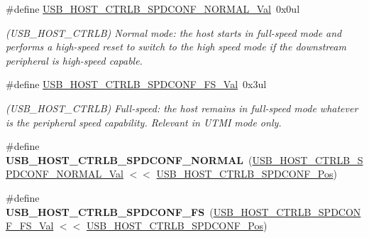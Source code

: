 \begin{DoxyCompactItemize}
\item 
\hypertarget{group___s_a_m_l21___u_s_b_ga42c2b2ba1944825832bb3ebe046512ba}{}\#define \hyperlink{group___s_a_m_l21___u_s_b_ga42c2b2ba1944825832bb3ebe046512ba}{U\+S\+B\+\_\+\+H\+O\+S\+T\+\_\+\+C\+T\+R\+L\+B\+\_\+\+S\+P\+D\+C\+O\+N\+F\+\_\+\+N\+O\+R\+M\+A\+L\+\_\+\+Val}~0x0ul\label{group___s_a_m_l21___u_s_b_ga42c2b2ba1944825832bb3ebe046512ba}

\begin{DoxyCompactList}\small\item\em (U\+S\+B\+\_\+\+H\+O\+S\+T\+\_\+\+C\+T\+R\+L\+B) Normal mode\+: the host starts in full-\/speed mode and performs a high-\/speed reset to switch to the high speed mode if the downstream peripheral is high-\/speed capable. \end{DoxyCompactList}\item 
\hypertarget{group___s_a_m_l21___u_s_b_ga8767ff75fe74316d97f511855ef2aca1}{}\#define \hyperlink{group___s_a_m_l21___u_s_b_ga8767ff75fe74316d97f511855ef2aca1}{U\+S\+B\+\_\+\+H\+O\+S\+T\+\_\+\+C\+T\+R\+L\+B\+\_\+\+S\+P\+D\+C\+O\+N\+F\+\_\+\+F\+S\+\_\+\+Val}~0x3ul\label{group___s_a_m_l21___u_s_b_ga8767ff75fe74316d97f511855ef2aca1}

\begin{DoxyCompactList}\small\item\em (U\+S\+B\+\_\+\+H\+O\+S\+T\+\_\+\+C\+T\+R\+L\+B) Full-\/speed\+: the host remains in full-\/speed mode whatever is the peripheral speed capability. Relevant in U\+T\+M\+I mode only. \end{DoxyCompactList}\item 
\hypertarget{group___s_a_m_l21___u_s_b_gaa62163b8cf85dcf89c89cd78be0b6dc7}{}\#define {\bfseries U\+S\+B\+\_\+\+H\+O\+S\+T\+\_\+\+C\+T\+R\+L\+B\+\_\+\+S\+P\+D\+C\+O\+N\+F\+\_\+\+N\+O\+R\+M\+A\+L}~(\hyperlink{group___s_a_m_l21___u_s_b_ga42c2b2ba1944825832bb3ebe046512ba}{U\+S\+B\+\_\+\+H\+O\+S\+T\+\_\+\+C\+T\+R\+L\+B\+\_\+\+S\+P\+D\+C\+O\+N\+F\+\_\+\+N\+O\+R\+M\+A\+L\+\_\+\+Val} $<$$<$ \hyperlink{group___s_a_m_l21___u_s_b_gae5052bc689326f7ae2f3d3414ab4c294}{U\+S\+B\+\_\+\+H\+O\+S\+T\+\_\+\+C\+T\+R\+L\+B\+\_\+\+S\+P\+D\+C\+O\+N\+F\+\_\+\+Pos})\label{group___s_a_m_l21___u_s_b_gaa62163b8cf85dcf89c89cd78be0b6dc7}

\item 
\hypertarget{group___s_a_m_l21___u_s_b_gab9e6e6e69fd5a960b7487f1db7f53a47}{}\#define {\bfseries U\+S\+B\+\_\+\+H\+O\+S\+T\+\_\+\+C\+T\+R\+L\+B\+\_\+\+S\+P\+D\+C\+O\+N\+F\+\_\+\+F\+S}~(\hyperlink{group___s_a_m_l21___u_s_b_ga8767ff75fe74316d97f511855ef2aca1}{U\+S\+B\+\_\+\+H\+O\+S\+T\+\_\+\+C\+T\+R\+L\+B\+\_\+\+S\+P\+D\+C\+O\+N\+F\+\_\+\+F\+S\+\_\+\+Val} $<$$<$ \hyperlink{group___s_a_m_l21___u_s_b_gae5052bc689326f7ae2f3d3414ab4c294}{U\+S\+B\+\_\+\+H\+O\+S\+T\+\_\+\+C\+T\+R\+L\+B\+\_\+\+S\+P\+D\+C\+O\+N\+F\+\_\+\+Pos})\label{group___s_a_m_l21___u_s_b_gab9e6e6e69fd5a960b7487f1db7f53a47}


\end{DoxyCompactItemize}
